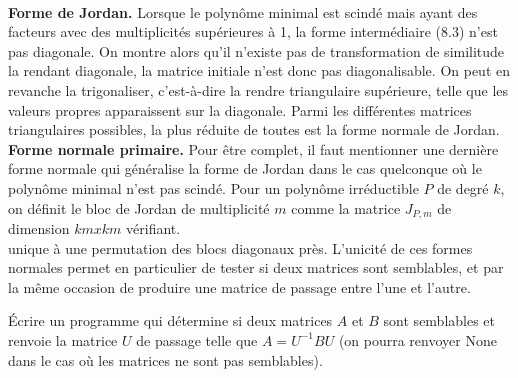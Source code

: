 \\
\textbf{Forme de Jordan.} Lorsque le polynôme minimal est scindé mais ayant des
facteurs avec des multiplicités supérieures à 1, la forme intermédiaire (8.3) n’est
pas diagonale. On montre alors qu’il n’existe pas de transformation de similitude
la rendant diagonale, la matrice initiale n’est donc pas diagonalisable. On peut
en revanche la trigonaliser, c’est-à-dire la rendre triangulaire supérieure, telle que
les valeurs propres apparaissent sur la diagonale. Parmi les différentes matrices
triangulaires possibles, la plus réduite de toutes est la forme normale de Jordan.
\\
\textbf{Forme normale primaire.} Pour être complet, il faut mentionner une dernière
forme normale qui généralise la forme de Jordan dans le cas quelconque où le
polynôme minimal n’est pas scindé. Pour un polynôme irréductible $P$ de degré $k$,
on définit le bloc de Jordan de multiplicité $m$ comme la matrice $J_{P,m}$ de dimension
$km x km$ vérifiant.
\\
unique à une permutation des blocs diagonaux près. L’unicité de ces formes normales permet en particulier de tester si deux matrices sont semblables, et par la même occasion de produire une matrice de
passage entre l’une et l’autre.

\begin{exercise}
Écrire un programme qui détermine si deux matrices $A$ et $B$ sont semblables et renvoie la matrice $U$ de passage telle que $A = U^{-1}BU$ (on pourra renvoyer None dans le cas où les matrices ne sont pas semblables).
\end{exercise}
